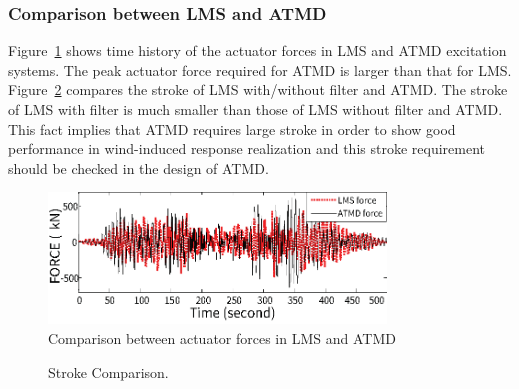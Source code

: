 \subsubsection{Comparison between LMS and ATMD}

Figure~\ref{fig:6-14} shows time history of the actuator forces in LMS and ATMD excitation systems. The peak actuator force required for ATMD is larger than that for LMS. Figure~\ref{fig:6-15} compares the stroke of LMS with/without filter and ATMD. The stroke of LMS with filter is much smaller than those of LMS without filter and ATMD. This fact implies that ATMD requires large stroke in order to show good performance in wind-induced response realization and this stroke requirement should be checked in the design of ATMD.

\begin{figure}[ht]
\centering
\includegraphics[width=0.8\textwidth] {figure/6-14.eps}
\caption{Comparison between actuator forces in LMS and ATMD}
\label{fig:6-14}
\end{figure}

\begin{figure}[!ht]
\centering
{}
\caption{Stroke Comparison.}
\label{fig:6-15}
\end{figure}

